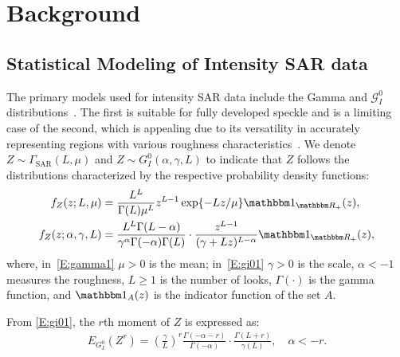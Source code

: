 \documentclass[remotesensing,article,submit,moreauthors,pdftex]{Definitions/mdpi}
\begin{document}
\hypertarget{sec:Background}{%
\section{Background}\label{sec:Background}}

\hypertarget{statistical-modeling-of-intensity-sar-data}{%
\subsection{Statistical Modeling of Intensity SAR
data}\label{statistical-modeling-of-intensity-sar-data}}

The primary models used for intensity SAR data include the Gamma and
\(\mathcal{G}_I^0\) distributions~\citep{Frery1997}. The first is
suitable for fully developed speckle and is a limiting case of the
second, which is appealing due to its versatility in accurately
representing regions with various roughness
characteristics~\citep{Cassetti2022}. We denote
\(Z \sim \Gamma_{\text{SAR}}(L, \mu)\) and
\(Z \sim G_I^0(\alpha, \gamma, L)\) to indicate that \(Z\) follows the
distributions characterized by the respective probability density
functions: \begin{align}
    f_Z(z;L, \mu)&=\frac{L^L}{\Gamma(L)\mu^L}z^{L-1}\exp\left\{-Lz/\mu\right\} \mathbbm 1_{\mathbbm R_+}(z),\label{E:gamma1}\\
    f_Z(z; \alpha, \gamma, L)&=\frac{L^L\Gamma(L-\alpha)}{\gamma^{\alpha}\Gamma(-\alpha)\Gamma(L)}\cdot\frac{z^{L-1}}{(\gamma+Lz)^{L-\alpha}} \mathbbm 1_{\mathbbm R_+}(z),\label{E:gi01}
\end{align} where, in~\eqref{E:gamma1} \(\mu > 0\) is the mean;
in~\eqref{E:gi01} \(\gamma > 0\) is the scale, \(\alpha < -1\) measures
the roughness, \(L \geq 1\) is the number of looks, \(\Gamma(\cdot)\) is
the gamma function, and \(\mathbbm 1_{A}(z)\) is the indicator function
of the set \(A\).

From \eqref{E:gi01}, the \(r\)th moment of \(Z\) is expressed as:
\begin{align}
    E_{G_I^0}\left(Z^r\right)=\left(\frac{\gamma}{L}\right)^r\frac{\Gamma(-\alpha-r)}{\Gamma(-\alpha)}\cdot\frac{\Gamma(L+r)}{\gamma(L)}, \quad \alpha <-r. 
    \label{E:rmom}
\end{align}
\end{document}
